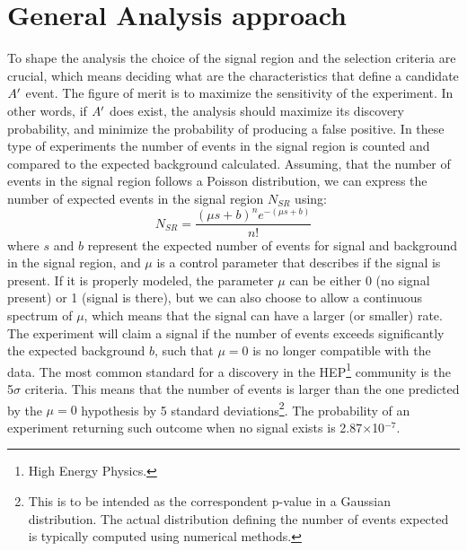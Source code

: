 \section{General Analysis approach}
\label{ch3:sec:analysis-approach}

To shape the analysis the choice of the signal region and the selection criteria are crucial, which means deciding what are the characteristics that define a candidate $A'$ event.
The figure of merit is to maximize the sensitivity of the experiment. In other words, if $A'$ does exist, the analysis should maximize its discovery probability, and minimize the probability of producing a false positive. In these type of experiments the number of events in the signal region is counted and compared to the expected background calculated. Assuming, that the number of events in the signal region follows a Poisson distribution, we can express the number of expected events in the signal region $N_{SR}$ using:
\begin{equation}
  \label{eq:poisson-simple}
  N_{SR} = \frac{(\mu s + b)^ne^{-(\mu s + b)}}{n!}
\end{equation}
where $s$ and $b$ represent the expected number of events for signal and background in the signal region, and $\mu$ is a control parameter that describes if the signal is present. If it is properly modeled, the parameter $\mu$ can be either 0 (no signal present) or 1 (signal is there), but we can also choose to allow a continuous spectrum of $\mu$, which means that the signal can have a larger (or smaller) rate. The experiment will claim a signal if the number of events exceeds significantly the expected background $b$, such that $\mu = 0$ is no longer compatible with the data. The most common standard for a discovery in the HEP\footnote{High Energy Physics.} community is the 5$\sigma$ criteria. This means that the number of events is larger than the one predicted by the $\mu = 0$ hypothesis by 5 standard deviations\footnote{This is to be intended as the correspondent p-value in a Gaussian distribution. The actual distribution defining the number of events expected is typically computed using numerical methods.}. The probability of an experiment returning such outcome when no signal exists is 2.87$\times$10$^{-7}$.

